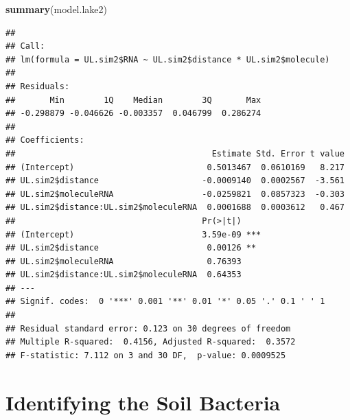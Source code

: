 \documentclass[]{article}
\newenvironment{Shaded}{\begin{snugshade}}{\end{snugshade}}
\newcommand{\KeywordTok}[1]{\textcolor[rgb]{0.13,0.29,0.53}{\textbf{#1}}}
\newcommand{\CommentTok}[1]{\textcolor[rgb]{0.56,0.35,0.01}{\textit{#1}}}
\newcommand{\NormalTok}[1]{#1}
\begin{document}
\begin{Shaded}
\begin{Highlighting}[]
\KeywordTok{summary}\NormalTok{(model.lake2)}
\end{Highlighting}
\end{Shaded}

\begin{verbatim}
## 
## Call:
## lm(formula = UL.sim2$RNA ~ UL.sim2$distance * UL.sim2$molecule)
## 
## Residuals:
##       Min        1Q    Median        3Q       Max 
## -0.298879 -0.046626 -0.003357  0.046799  0.286274 
## 
## Coefficients:
##                                        Estimate Std. Error t value
## (Intercept)                           0.5013467  0.0610169   8.217
## UL.sim2$distance                     -0.0009140  0.0002567  -3.561
## UL.sim2$moleculeRNA                  -0.0259821  0.0857323  -0.303
## UL.sim2$distance:UL.sim2$moleculeRNA  0.0001688  0.0003612   0.467
##                                      Pr(>|t|)    
## (Intercept)                          3.59e-09 ***
## UL.sim2$distance                      0.00126 ** 
## UL.sim2$moleculeRNA                   0.76393    
## UL.sim2$distance:UL.sim2$moleculeRNA  0.64353    
## ---
## Signif. codes:  0 '***' 0.001 '**' 0.01 '*' 0.05 '.' 0.1 ' ' 1
## 
## Residual standard error: 0.123 on 30 degrees of freedom
## Multiple R-squared:  0.4156, Adjusted R-squared:  0.3572 
## F-statistic: 7.112 on 3 and 30 DF,  p-value: 0.0009525
\end{verbatim}

\begin{Shaded}
\end{Shaded}

\section{Identifying the Soil
Bacteria}\label{identifying-the-soil-bacteria}
\end{document}
